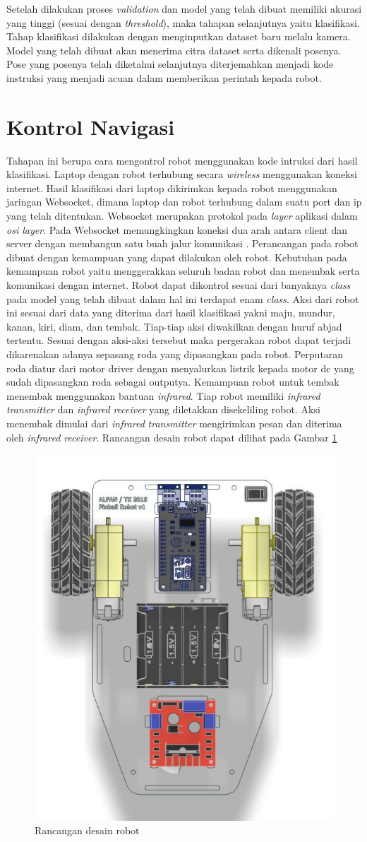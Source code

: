 Setelah dilakukan proses \emph{validation} dan model yang telah dibuat memiliki akurasi yang tinggi (sesuai dengan \emph{threshold}), maka tahapan selanjutnya yaitu klasifikasi. Tahap klasifikasi dilakukan dengan menginputkan dataset baru melalu kamera. Model yang telah dibuat akan menerima citra dataset serta dikenali posenya. Pose yang posenya telah diketahui selanjutnya diterjemahkan menjadi kode instruksi yang menjadi acuan dalam memberikan perintah kepada robot.


\section{Kontrol Navigasi} 
Tahapan ini berupa cara mengontrol robot menggunakan kode intruksi dari hasil klasifikasi. Laptop dengan robot terhubung secara \emph{wireless} menggunakan koneksi internet. Hasil klasifikasi dari laptop dikirimkan kepada robot menggunakan jaringan Websocket, dimana laptop dan robot terhubung dalam suatu port dan ip yang telah ditentukan. Websocket merupakan protokol pada \emph{layer} aplikasi dalam \emph{osi layer}. Pada Websocket memungkingkan koneksi dua arah antara client dan server dengan membangun satu buah jalur komunikasi \parencite{websocket}. Perancangan pada robot dibuat dengan kemampuan yang dapat dilakukan oleh robot. Kebutuhan pada kemampuan robot yaitu menggerakkan seluruh badan robot dan menembak serta komunikasi dengan internet. Robot dapat dikontrol sesuai dari banyaknya \emph{class} pada model yang telah dibuat dalam hal ini terdapat enam \emph{class}. Aksi dari robot ini sesuai dari data yang diterima dari hasil klasifikasi yakni maju, mundur, kanan, kiri, diam, dan tembak. Tiap-tiap aksi diwakilkan dengan huruf abjad tertentu. Sesuai dengan aksi-aksi tersebut maka pergerakan robot dapat terjadi dikarenakan adanya sepasang roda yang dipasangkan pada robot. Perputaran roda diatur dari motor driver dengan menyalurkan listrik kepada motor dc yang sudah dipasangkan roda sebagai outputya. Kemampuan robot untuk tembak menembak menggunakan bantuan \emph{infrared}. Tiap robot memiliki \emph{infrared} \emph{transmitter} dan \emph{infrared} \emph{receiver} yang diletakkan disekeliling robot. Aksi menembak dimulai dari \emph{infrared} \emph{transmitter} mengirimkan pesan dan diterima oleh \emph{infrared} \emph{receiver}. Rancangan desain robot dapat dilihat pada Gambar \ref{fig:rancanganrobot}

\begin{figure}[!h]
  \centering
  \includegraphics[width=0.3\linewidth]{../Gambar/rancnaganrobot.jpg}
  \caption{Rancangan desain robot}
  \label{fig:rancanganrobot}
\end{figure}
